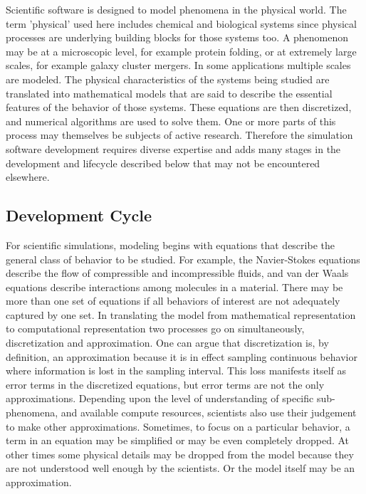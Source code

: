 \label{sec:lifecycle} 
Scientific software is designed to model phenomena in the
physical world. The term 'physical' used here includes chemical and
biological systems since physical processes are underlying building
blocks for those systems too. A phenomenon may be at a microscopic
level, for example protein folding, or at extremely large scales, for
example galaxy cluster mergers.  In some applications multiple scales
are modeled.  The physical characteristics of the systems being
studied are translated into mathematical models that are said to
describe the essential features of the behavior of those
systems. These equations are then discretized, and numerical
algorithms are used to solve them. One or more parts of this process
may themselves be subjects of active research. Therefore the
simulation software development requires diverse expertise and 
adds many stages in the development and lifecycle described below that
may not be encountered elsewhere.  

\subsection{Development Cycle}
\label{sec:dev-cycle}
For scientific simulations, modeling begins with equations that describe the
general class of behavior to be studied. For example, the Navier-Stokes
equations describe the flow of compressible and incompressible
fluids, and van der Waals equations describe interactions among
molecules in a material. There may be more than one set of equations
if all behaviors of interest are not adequately captured by one set.
In translating the model from mathematical representation to
computational representation two processes go on simultaneously,
discretization and approximation. One can argue that discretization is,
by definition, an approximation because it is in effect sampling
continuous behavior where information is lost in the sampling
interval. This loss manifests itself as error terms in the discretized
equations, but error terms are not the only 
approximations. Depending upon the level of understanding of specific
sub-phenomena, and available compute resources, scientists also 
use their judgement to make other approximations. Sometimes, to focus on a
particular behavior, a term in an equation may be simplified or may be even completely
dropped. At other times some physical details may be dropped
from the model because they are not understood well enough by the
scientists.  Or the model itself may be an approximation.  

